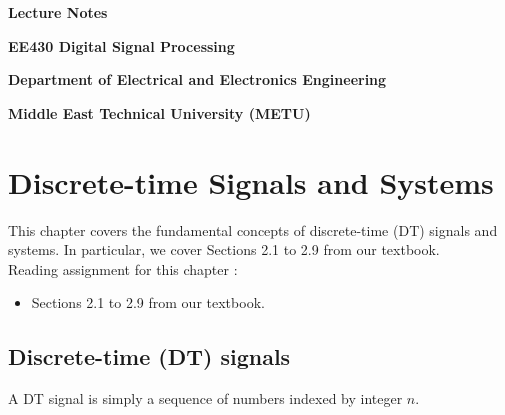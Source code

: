 \documentclass[10pt,a4paper,report]{report}       %
\begin{document}
\begin{titlepage}
    \begin{center}
        \vspace*{1cm}
        \vspace{3.5cm}
        \textbf{{\Huge Lecture Notes}}
        
        \vspace{1.5cm}
        \textbf{{\Huge EE430 Digital Signal Processing}}
        
        \vspace{0.5cm}
        \vspace{5.5cm}
        \vspace{2.5cm}
        \textbf{{\Large Department of Electrical and Electronics Engineering}}
        
        \vspace{0.5cm}
        \textbf{{\Large Middle East Technical University (METU)}}
    \end{center}
\end{titlepage}

\dominitoc%
\tableofcontents %
\large %


\chapter{Discrete-time Signals and Systems}
\minitoc%
\vspace {2cm}

This chapter covers the fundamental concepts of discrete-time (DT) signals and systems. In particular, we cover Sections 2.1 to 2.9 from our textbook.\\


Reading assignment for this chapter :
\begin{itemize}
  \item Sections 2.1 to 2.9 from our textbook.
\end{itemize}

\newpage
\section{Discrete-time (DT) signals}

A DT signal is simply a sequence of numbers indexed by integer $n$.\\
\vspace{3cm}
\end{document}
